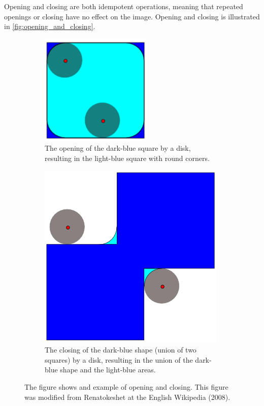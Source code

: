 Opening and closing are both idempotent operations, meaning that repeated openings or closing have no effect on the image. Opening and closing is illustrated in \autoref{fig:opening_and_closing}.
\begin{figure}[h]
    \centering
    \begin{subfigure}[t]{0.45\textwidth}
        \centering
        \includegraphics[width=0.5\linewidth]{figures/detection/opening.png}
        \caption{The opening of the dark-blue square by a disk, resulting in the light-blue square with round corners.}
        \label{fig:opening}
    \end{subfigure}
    \quad
    \begin{subfigure}[t]{0.45\textwidth}
        \centering
        \includegraphics[width=0.5\linewidth]{figures/detection/closing.png}
        \caption{The closing of the dark-blue shape (union of two squares) by a disk, resulting in the union of the dark-blue shape and the light-blue areas.}
        \label{fig:closing}
    \end{subfigure}
    \caption{The figure shows and example of opening and closing. This figure was modified from Renatokeshet at the English Wikipedia (2008).}
    \label{fig:opening_and_closing}
\end{figure}

